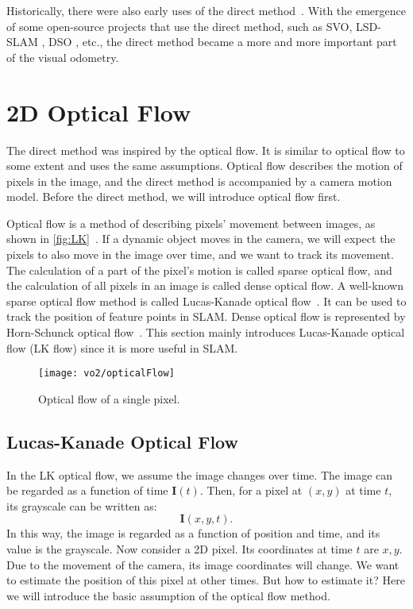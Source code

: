 Historically, there were also early uses of the direct method~\cite{Silveira2008}. With the emergence of some open-source projects that use the direct method, such as SVO{\cite{Forster2014}}, LSD-SLAM {\cite{Engel2014}}, DSO {\cite{Engel2016}}, etc., the direct method became a more and more important part of the visual odometry.

\section{2D Optical Flow}
The direct method was inspired by the optical flow. It is similar to optical flow to some extent and uses the same assumptions. Optical flow describes the motion of pixels in the image, and the direct method is accompanied by a camera motion model. Before the direct method, we will introduce optical flow first.

Optical flow is a method of describing pixels' movement between images, as shown in \autoref{fig:LK}~. If a dynamic object moves in the camera, we will expect the pixels to also move in the image over time, and we want to track its movement. The calculation of a part of the pixel's motion is called sparse optical flow, and the calculation of all pixels in an image is called dense optical flow. A well-known sparse optical flow method is called Lucas-Kanade optical flow~\cite{Lucas1981}. It can be used to track the position of feature points in SLAM. Dense optical flow is represented by Horn-Schunck optical flow~\cite{Horn1981}. This section mainly introduces Lucas-Kanade optical flow (LK flow) since it is more useful in SLAM.

\begin{figure}[!htp]
	\centering
	\texttt{[image: vo2/opticalFlow]}
	\caption{Optical flow of a single pixel.}
	\label{fig:LK}
\end{figure}

\subsection*{Lucas-Kanade Optical Flow}
In the LK optical flow, we assume the image changes over time. The image can be regarded as a function of time $\mathbf{I}(t)$. Then, for a pixel at $(x,y)$ at time $t$, its grayscale can be written as:
\[
\mathbf{I}(x,y,t).
\]
In this way, the image is regarded as a function of position and time, and its value is the grayscale. Now consider a 2D pixel. Its coordinates at time $t$ are $x,y$. Due to the movement of the camera, its image coordinates will change. We want to estimate the position of this pixel at other times. But how to estimate it? Here we will introduce the basic assumption of the optical flow method.

